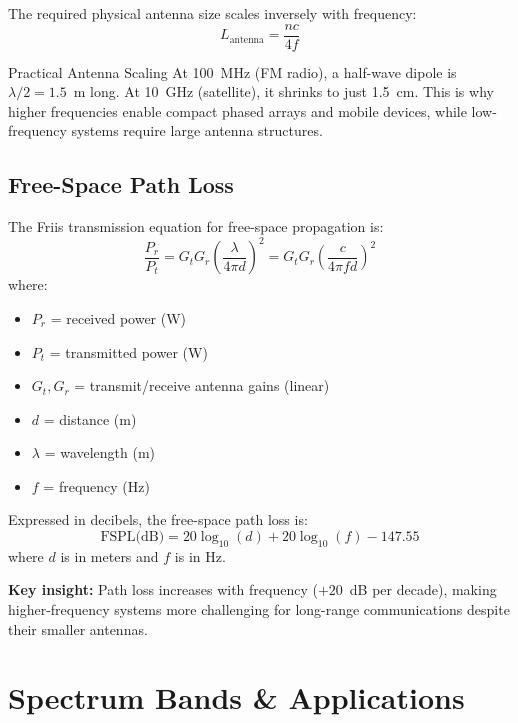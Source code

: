 The required physical antenna size scales inversely with frequency:
\begin{equation}
L_{\text{antenna}} = \frac{nc}{4f}
\end{equation}

\begin{calloutbox}{Practical Antenna Scaling}
At 100~MHz (FM radio), a half-wave dipole is $\lambda/2 = 1.5$~m long. At 10~GHz (satellite), it shrinks to just 1.5~cm. This is why higher frequencies enable compact phased arrays and mobile devices, while low-frequency systems require large antenna structures.
\end{calloutbox}

\subsection{Free-Space Path Loss}

The Friis transmission equation for free-space propagation is:
\begin{equation}
\frac{P_r}{P_t} = G_t G_r \left(\frac{\lambda}{4\pi d}\right)^2 = G_t G_r \left(\frac{c}{4\pi f d}\right)^2
\end{equation}
where:
\begin{itemize}
\item $P_r$ = received power (W)
\item $P_t$ = transmitted power (W)
\item $G_t, G_r$ = transmit/receive antenna gains (linear)
\item $d$ = distance (m)
\item $\lambda$ = wavelength (m)
\item $f$ = frequency (Hz)
\end{itemize}

Expressed in decibels, the free-space path loss is:
\begin{equation}
\text{FSPL(dB)} = 20\log_{10}(d) + 20\log_{10}(f) - 147.55
\end{equation}
where $d$ is in meters and $f$ is in Hz.

\textbf{Key insight:} Path loss increases with frequency ($+20$~dB per decade), making higher-frequency systems more challenging for long-range communications despite their smaller antennas.

\section{Spectrum Bands \& Applications}

